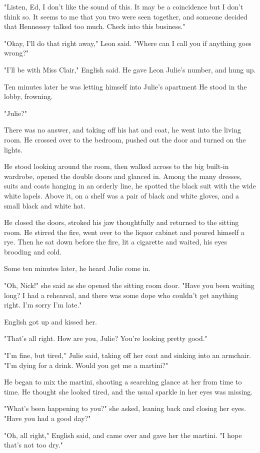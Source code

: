 \documentclass{novel}
\begin{document}
"Listen, Ed, I don't like the sound of this. It may be a coincidence but I don't think so. It seems to me that you two were seen together, and someone decided that Hennessey talked too much. Check into this business."

"Okay, I'll do that right away," Leon said. "Where can I call you if anything goes wrong?"

"I'll be with Miss Clair," English said. He gave Leon Julie's number, and hung up.

Ten minutes later he was letting himself into Julie's apartment He stood in the lobby, frowning.

"Julie?"

There was no answer, and taking off his hat and coat, he went into the living room. He crossed over to the bedroom, pushed out the door and turned on the lights.

He stood looking around the room, then walked across to the big built-in wardrobe, opened the double doors and glanced in. Among the many dresses, suits and coats hanging in an orderly line, he spotted the black suit with the wide white lapels. Above it, on a shelf was a pair of black and white gloves, and a small black and white hat.

He closed the doors, stroked his jaw thoughtfully and returned to the sitting room. He stirred the fire, went over to the liquor cabinet and poured himself a rye. Then he sat down before the fire, lit a cigarette and waited, his eyes brooding and cold.

Some ten minutes later, he heard Julie come in.

"Oh, Nick!" she said as she opened the sitting room door. "Have you been waiting long? I had a rehearsal, and there was some dope who couldn't get anything right. I'm sorry I'm late."

English got up and kissed her.

"That's all right. How are you, Julie? You're looking pretty good."

"I'm fine, but tired," Julie said, taking off her coat and sinking into an armchair. "I'm dying for a drink. Would you get me a martini?"

He began to mix the martini, shooting a searching glance at her from time to time. He thought she looked tired, and the usual sparkle in her eyes was missing.

"What's been happening to you?" she asked, leaning back and closing her eyes. "Have you had a good day?"

"Oh, all right," English said, and came over and gave her the martini. "I hope that's not too dry."
\end{document}
